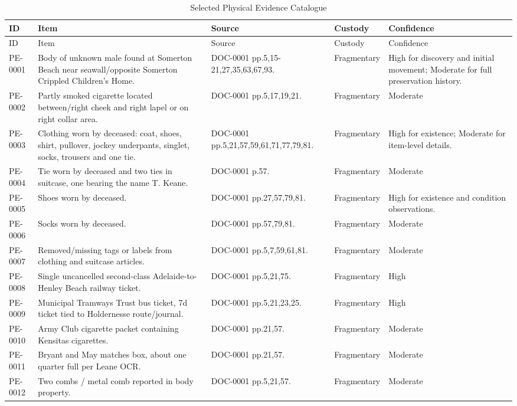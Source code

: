 \begin{longtable}{p{}p{}p{}p{}p{}}
\caption{Selected Physical Evidence Catalogue}\label{tab:physical-evidence-catalogue}\\
\toprule
ID & Item & Source & Custody & Confidence \\
\midrule
\endfirsthead
\toprule
ID & Item & Source & Custody & Confidence \\
\midrule
\endhead
PE-0001 & Body of unknown male found at Somerton Beach near seawall/opposite Somerton Crippled Children's Home. & DOC-0001 pp.5,15-21,27,35,63,67,93. & Fragmentary & High for discovery and initial movement; Moderate for full preservation history. \\
PE-0002 & Partly smoked cigarette located between/right cheek and right lapel or on right collar area. & DOC-0001 pp.5,17,19,21. & Fragmentary & Moderate \\
PE-0003 & Clothing worn by deceased: coat, shoes, shirt, pullover, jockey underpants, singlet, socks, trousers and one tie. & DOC-0001 pp.5,21,57,59,61,71,77,79,81. & Fragmentary & High for existence; Moderate for item-level details. \\
PE-0004 & Tie worn by deceased and two ties in suitcase, one bearing the name T. Keane. & DOC-0001 p.57. & Fragmentary & Moderate \\
PE-0005 & Shoes worn by deceased. & DOC-0001 pp.27,57,79,81. & Fragmentary & High for existence and condition observations. \\
PE-0006 & Socks worn by deceased. & DOC-0001 pp.57,79,81. & Fragmentary & Moderate \\
PE-0007 & Removed/missing tags or labels from clothing and suitcase articles. & DOC-0001 pp.5,7,59,61,81. & Fragmentary & Moderate \\
PE-0008 & Single uncancelled second-class Adelaide-to-Henley Beach railway ticket. & DOC-0001 pp.5,21,75. & Fragmentary & High \\
PE-0009 & Municipal Tramways Trust bus ticket, 7d ticket tied to Holdernesse route/journal. & DOC-0001 pp.5,21,23,25. & Fragmentary & High \\
PE-0010 & Army Club cigarette packet containing Kensitas cigarettes. & DOC-0001 pp.21,57. & Fragmentary & Moderate \\
PE-0011 & Bryant and May matches box, about one quarter full per Leane OCR. & DOC-0001 pp.21,57. & Fragmentary & Moderate \\
PE-0012 & Two combs / metal comb reported in body property. & DOC-0001 pp.5,21,57. & Fragmentary & Moderate \\

\end{longtable}
